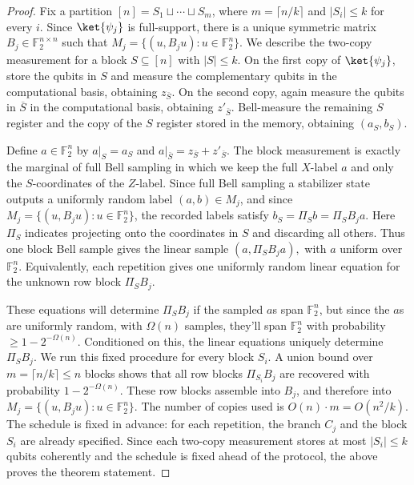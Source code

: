 \documentclass[11pt]{article}
\newcommand{\F}{\mathbb{F}}
\begin{document}
\begin{proof}
Fix a partition $[n]=S_1\sqcup\cdots\sqcup S_m$, where
$m=\lceil n/k\rceil$ and $|S_i|\le k$ for every $i$.  Since $\ket{\psi_j}$ is
full-support, there is a unique symmetric matrix $B_j\in\F_2^{n\times n}$ such
that $M_j=\{(u,B_j u):u\in\F_2^n\}$. We describe the two-copy measurement for a block $S\subseteq[n]$ with
$|S|\le k$. On the first copy of $\ket{\psi_j}$, store the qubits in $S$ and
measure the complementary qubits in the computational basis, obtaining
$z_{\bar S}$.  On the second copy, again measure the qubits in $\overline{S}$ in the computational basis, obtaining $z'_{\bar S}$.
Bell-measure the remaining $S$ register and the copy of the $S$ register stored in the memory, obtaining $(a_S,b_S)$.

Define $a\in\F_2^n$ by $a|_S=a_S$ and
$a|_{\bar S}=z_{\bar S}+z'_{\bar S}$.  The block measurement is exactly the
marginal of full Bell sampling in which we keep the full $X$-label $a$ and only
the $S$-coordinates of the $Z$-label.  Since full Bell sampling a stabilizer
state outputs a uniformly random label $(a,b)\in M_j$, and since
$M_j=\{(u,B_j u):u\in\F_2^n\}$, the recorded labels satisfy
$    b_S=\Pi_S b=\Pi_S B_j a $. Here $\Pi_S$ indicates projecting onto the coordinates in $S$ and discarding all others. Thus one block Bell sample gives the linear sample
$    (a,\Pi_S B_j a),$ 
with $a$ uniform over $\F_2^n$.  Equivalently, each repetition gives one
uniformly random linear equation for the unknown row block $\Pi_SB_j$.

These equations will determine $\Pi_SB_j$ if the sampled $a$s span $\F_2^n$, but since the $a$s are uniformly random, with $\Omega(n)$ samples, they'll span $\F_2^n$ with probability $\geq 1-2^{-\Omega(n)}$.  Conditioned on this, the linear equations uniquely determine $\Pi_SB_j$. We run this fixed procedure for every block $S_i$.  A union bound over $m=\lceil n/k\rceil\le n$ blocks shows that all row blocks $\Pi_{S_i}B_j$ are recovered with probability $1-2^{-\Omega(n)}$.  These row
blocks assemble into $B_j$, and therefore into
$M_j=\{(u,B_j u):u\in\F_2^n\}$. The number of copies used is $O(n)\cdot m=O(n^2/k)$.  The schedule is
fixed in advance: for each repetition, the branch $C_j$ and the block $S_i$ are
already specified.  Since each two-copy measurement stores at most $|S_i|\le k$ 
qubits coherently and the schedule is fixed ahead of the protocol, the above proves the theorem statement.
\end{proof}
\end{document}
